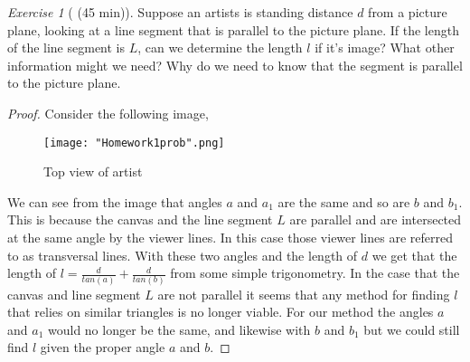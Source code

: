 \documentclass[12pt]{amsart}
\theoremstyle{remark}
\newtheorem*{exercise}{Exercise}%
\newcommand{\bc}{\begin{center}}
\newcommand{\ec}{\end{center}}
\theoremstyle{mycomment}
\begin{document}
\thispagestyle{fancy}

\begin{exercise}[ (45 min)] Suppose an artists is standing distance $d$ from a picture plane, looking at a line segment that is parallel to the picture plane. If the length of the line segment is $L$, can we determine the length $l$ if it's image? What other information might we need? Why do we need to know that the segment is parallel to the picture plane.   

\begin{proof} Consider the following image,

\begin{figure}[ht]
\caption{Top view of artist}
\centering
\texttt{[image: "Homework1prob".png]}
\end{figure}


We can see from the image that angles $a$ and $a_1$ are the same and so are $b$ and $b_1$. This is because the canvas and the line segment $L$ are parallel and are intersected at the same angle by the viewer lines. In this case those viewer lines are referred to as transversal lines. With these two angles and the length of $d$ we get that the length of $l = \frac{d}{tan(a)}+\frac{d}{tan(b)}$ from some simple trigonometry. In the case that the canvas and line segment $L$ are not parallel it seems that any method for finding $l$ that relies on similar triangles is no longer viable. For our method the angles $a$ and $a_1$ would no longer be the same, and likewise with $b$ and $b_1$ but we could still find $l$ given the proper angle $a$ and $b$.


%
%
%
\end{proof}
\end{exercise}
\end{document}
